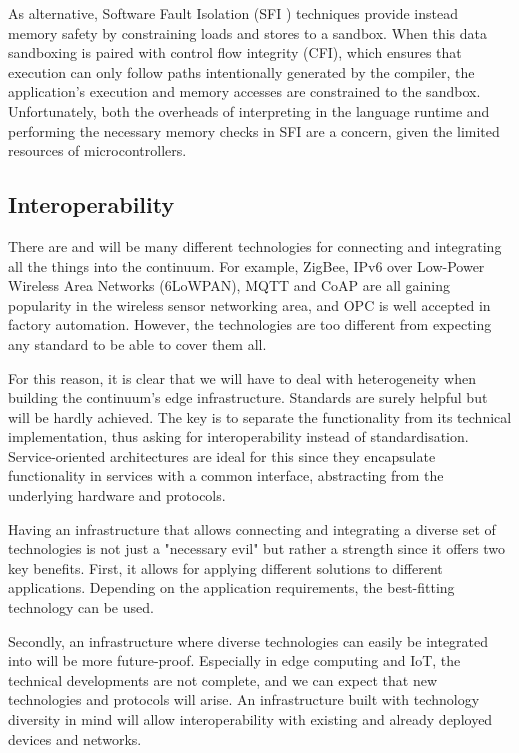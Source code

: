 As alternative, Software Fault Isolation (SFI \cite{sfi}) techniques provide instead memory safety by constraining loads and stores to a sandbox. When this data sandboxing is paired with control flow integrity (CFI), which ensures that execution can only follow paths intentionally generated by the compiler, the application's execution and memory accesses are constrained to the sandbox. Unfortunately, both the overheads of interpreting in the language runtime and performing the necessary memory checks in SFI are a concern, given the limited resources of microcontrollers.

\subsection{Interoperability}
\label{sec:interoperability}

There are and will be many different technologies for connecting and integrating all the things into the continuum. For example, ZigBee, IPv6 over Low-Power Wireless Area Networks (6LoWPAN), MQTT and CoAP \cite{mqtt-coap-amqp-http} are all gaining popularity in the wireless sensor networking area, and OPC \cite{rest-opc} is well accepted in factory automation. However, the technologies are too different from expecting any standard to be able to cover them all.

For this reason, it is clear that we will have to deal with heterogeneity when building the continuum's edge infrastructure. Standards are surely helpful but will be hardly achieved. The key is to separate the functionality from its technical implementation, thus asking for interoperability instead of standardisation. Service-oriented architectures are ideal for this since they encapsulate functionality in services with a common interface, abstracting from the underlying hardware and protocols.

Having an infrastructure that allows connecting and integrating a diverse set of technologies is not just a "necessary evil" but rather a strength since it offers two key benefits. First, it allows for applying different solutions to different applications. Depending on the application requirements, the best-fitting technology can be used.

Secondly, an infrastructure where diverse technologies can easily be integrated into will be more future-proof. Especially in edge computing and IoT, the technical developments are not complete, and we can expect that new technologies and protocols will arise. An infrastructure built with technology diversity in mind will allow interoperability with existing and already deployed devices and networks.

